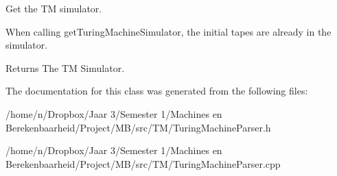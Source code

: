 \-Get the \-T\-M simulator. 

\-When calling get\-Turing\-Machine\-Simulator, the initial tapes are already in the simulator. \begin{DoxyReturn}{\-Returns}
\-The \-T\-M \-Simulator. 
\end{DoxyReturn}


\-The documentation for this class was generated from the following files\-:\begin{DoxyCompactItemize}
\item 
/home/n/\-Dropbox/\-Jaar 3/\-Semester 1/\-Machines en Berekenbaarheid/\-Project/\-M\-B/src/\-T\-M/\-Turing\-Machine\-Parser.\-h\item 
/home/n/\-Dropbox/\-Jaar 3/\-Semester 1/\-Machines en Berekenbaarheid/\-Project/\-M\-B/src/\-T\-M/\-Turing\-Machine\-Parser.\-cpp\end{DoxyCompactItemize}
